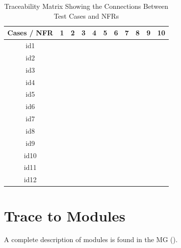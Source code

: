 \documentclass[12pt, titlepage]{article}
\begin{document}
\begin{table}[!h]
	\begin{center}
		\begin{tabular}{| c | c | c | c | c | c | c | c | c | c | c |}
			\hline
			Cases / NFR & 1 & 2 & 3 & 4 & 5 & 6 & 7 & 8 & 9 & 10\\
			\hline
			id1 & & & & & & & & & &\\
			\hline
			id2 & \checkmark& & & & & & & & &\\
			\hline
			id3 & & & & & & & & & &\\
			\hline
			id4 & & & & & & & & & &\\
			\hline
			id5 & & & & & & & & & &\\
			\hline
			id6 & & & & & & & & & &\\
			\hline
			id7 & & & & & & & & & &\\
			\hline
			id8 & \checkmark& & & & & & & & &\\
			\hline
			id9 & & & & & & & & & &\\
			\hline
			id10 & & & & & & & & & &\\
			\hline
			id11 & & & \checkmark& & & & & & &\\
			\hline
			id12 & & & & & & & & \checkmark& &\\
			\hline
		\end{tabular}
		\caption{Traceability Matrix Showing the Connections Between Test Cases and NFRs}
		\label{Table:TRCNFR}
	\end{center}
\end{table}  


\newpage
		
\section{Trace to Modules}	
\label{modulecoverage}	

A complete description of modules is found in the MG (\citet{LBM_MG_PM}).
\end{document}
